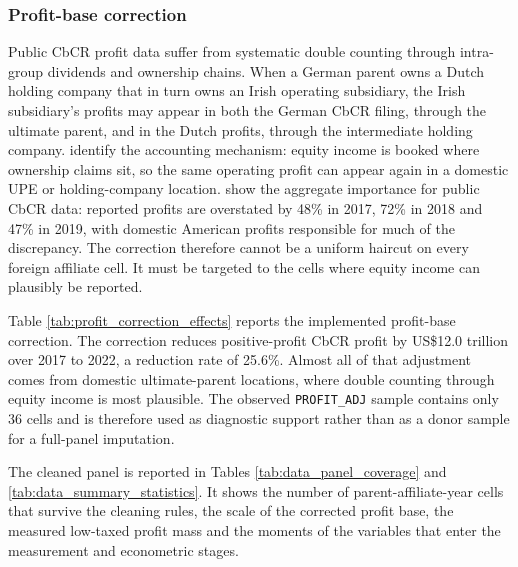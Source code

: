 \documentclass[11pt,a4paper]{article}
\newcommand{\code}[1]{\texttt{#1}}
\begin{document}
\subsubsection{Profit-base correction}\label{sec:doublecounting}

Public CbCR profit data suffer from systematic double counting through intra-group dividends and ownership chains. When a German parent owns a Dutch holding company that in turn owns an Irish operating subsidiary, the Irish subsidiary's profits may appear in both the German CbCR filing, through the ultimate parent, and in the Dutch profits, through the intermediate holding company. \citet{blouin2023} identify the accounting mechanism: equity income is booked where ownership claims sit, so the same operating profit can appear again in a domestic UPE or holding-company location. \citet{garcia-bernardo2022a} show the aggregate importance for public CbCR data: reported profits are overstated by 48\% in 2017, 72\% in 2018 and 47\% in 2019, with domestic American profits responsible for much of the discrepancy. The correction therefore cannot be a uniform haircut on every foreign affiliate cell. It must be targeted to the cells where equity income can plausibly be reported.



Table \ref{tab:profit_correction_effects} reports the implemented profit-base correction. The correction reduces positive-profit CbCR profit by US\$12.0 trillion over 2017 to 2022, a reduction rate of 25.6\%. Almost all of that adjustment comes from domestic ultimate-parent locations, where double counting through equity income is most plausible. The observed \code{PROFIT\_ADJ} sample contains only 36 cells and is therefore used as diagnostic support rather than as a donor sample for a full-panel imputation.

The cleaned panel is reported in Tables \ref{tab:data_panel_coverage} and \ref{tab:data_summary_statistics}. It shows the number of parent-affiliate-year cells that survive the cleaning rules, the scale of the corrected profit base, the measured low-taxed profit mass and the moments of the variables that enter the measurement and econometric stages.


\end{document}
